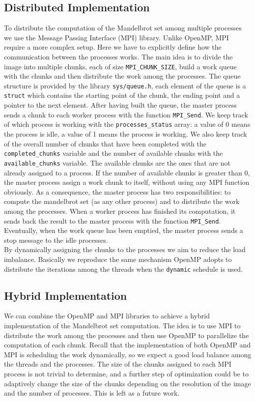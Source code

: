 \subsection{Distributed Implementation}
    To distribute the computation of the Mandelbrot set among multiple processes
    we use the Message Passing Interface (MPI) library. Unlike OpenMP, MPI require
    a more complex setup. Here we have to explicitly define how the communication
    between the processes works. The main idea is to divide the image into multiple
    chunks, each of size \texttt{MPI\_CHUNK\_SIZE}, build a work queue with the
    chunks and then distribute the work among the processes. The queue structure
    is provided by the library \texttt{sys/queue.h}, each element of the queue
    is a \texttt{struct} which contains the starting point of the chunk, the
    ending point and a pointer to the next element. After having built the queue,
    the master process sends a chunk to each worker process with the function
    \texttt{MPI\_Send}. We keep track of which process is working with the
    \texttt{processes\_status} array: a value of 0 means the process is idle, a
    value of 1 means the process is working. We also keep track of the overall
    number of chunks that have been completed with the \texttt{completed\_chunks}
    variable and the number of available chunks with the \texttt{available\_chunks}
    variable. The available chunks are the ones that are not already assigned 
    to a process. If the number of available chunks is greater than 0, the master
    process assign a work chunk to itself, without using any MPI function obviously.
    As a consequence, the master process has two responsibilities: to compute
    the mandelbrot set (as any other process) and to distribute the work among
    the processes. When a worker process has finished its computation, it sends
    back the result to the master process with the function \texttt{MPI\_Send}.
    Eventually, when the work queue has been emptied, the master process sends
    a stop message to the idle processes. \\
    By dynamically assigning the chunks to the processes we aim to reduce the
    load imbalance. Basically we reproduce the same mechanism OpenMP adopts
    to distribute the iterations among the threads when the \texttt{dynamic}
    schedule is used.

\subsection{Hybrid Implementation}
    We can combine the OpenMP and MPI libraries to achieve a hybrid implementation
    of the Mandelbrot set computation. The idea is to use MPI to distribute the
    work among the processes and then use OpenMP to parallelize the computation
    of each chunk. Recall that the implementation of both OpenMP and MPI is
    scheduling the work dynamically, so we expect a good load balance among the
    threads and the processes. The size of the chunks assigned to each MPI process
    is not trivial to determine, and a further step of optimization could be
    to adaptively change the size of the chunks depending on the resolution
    of the image and the number of processes. This is left as a future work.

